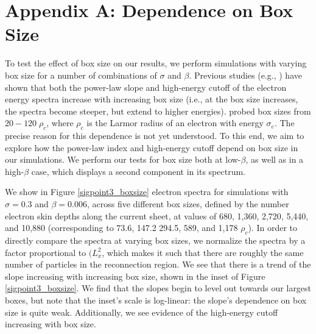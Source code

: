 \section{Appendix A: Dependence on Box Size}\label{boxsize}
To test the effect of box size on our results, we perform simulations with varying box size for a number of combinations of $\sigma$ and $\beta$.  Previous studies (e.g., \citealt{werner2018}) have shown that both the power-law slope and high-energy cutoff of the electron energy spectra increase with increasing box size (i.e., at the box size increases, the spectra become steeper, but extend to higher energies).  \citet{werner2018} probed box sizes from $20-120 \; \rho_{c}$, where $\rho_{c}$ is the Larmor radius of an electron with energy $\sigma_{e}$.  The precise reason for this dependence is not yet understood.  To this end, we aim to explore how the power-law index and high-energy cutoff depend on box size in our simulations. We perform our tests for box size both at low-$\beta$, as well as in a high-$\beta$ case, which displays a second component in its spectrum.  

We show in Figure \ref{sigpoint3_boxsize} electron spectra for simulations with $\sigma=0.3$ and $\beta=0.006$, across five different box sizes, defined by the number electron skin depths along the current sheet, at values of 680, 1,360, 2,720, 5,440, and 10,880 (corresponding to 73.6, 147.2 294.5, 589, and 1,178 $\rho_{c}$).  In order to directly compare the spectra at varying box sizes, we normalize the spectra by a factor proportional to $(L_{x}^{2}$, which makes it such that there are roughly the same number of particles in the reconnection region.  We see that there is a trend of the slope increasing with increasing box size, shown in the inset of Figure \ref{sigpoint3_boxsize}.  We find that the slopes begin to level out towards our largest boxes, but note that the inset's scale is log-linear: the slope's dependence on box size is quite weak.  Additionally, we see evidence of the high-energy cutoff increasing with box size.


